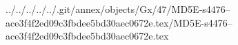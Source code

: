 ../../../../../.git/annex/objects/Gx/47/MD5E-s4476--ace3f4f2ed09c3fbdee5bd30aec0672e.tex/MD5E-s4476--ace3f4f2ed09c3fbdee5bd30aec0672e.tex